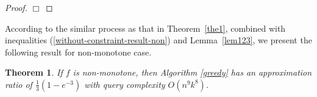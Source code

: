 \documentclass[preprint,12pt]{elsarticle}
\newtheorem{theorem}{Theorem}
\def\bea{\begin{eqnarray}}
\def\eea{\end{eqnarray}}
\def\endzm{\hfill $\Box$ \bigskip}
\def\bo{\boldsymbol{o}}
\def\bs{\boldsymbol{s}}
\def\bq{\boldsymbol{q}}
\def\bI{\boldsymbol{I}}
\begin{document}
\begin{proof}
\endzm
\end{proof}



According to the similar process as that in Theorem~\ref{the1}, combined with inequalities (\ref{without-constraint-result-non}) and Lemma~\ref{lem123}, we present the  following result for non-monotone case.
\begin{theorem}\label{non-montone}
If $f$ is non-monotone, then Algorithm \ref{greedy} has an approximation ratio of $\frac{1}{3}(1-e^{-3})$ with query complexity $O(n^{9}k^{8})$.
\end{theorem}
\end{document}

